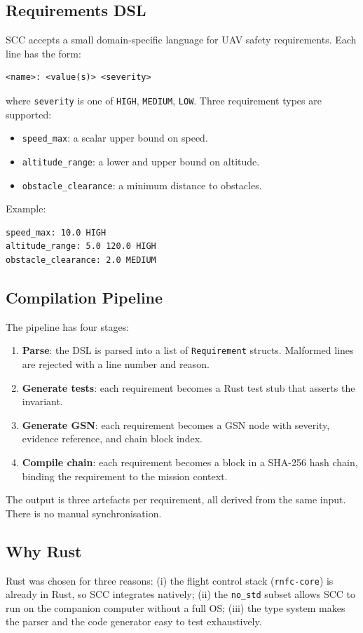 \subsection{Requirements DSL}
SCC accepts a small domain-specific language for UAV safety
requirements. Each line has the form:
\begin{verbatim}
<name>: <value(s)> <severity>
\end{verbatim}
where \texttt{severity} is one of \texttt{HIGH}, \texttt{MEDIUM},
\texttt{LOW}. Three requirement types are supported:
\begin{itemize}
    \item \texttt{speed\_max}: a scalar upper bound on speed.
    \item \texttt{altitude\_range}: a lower and upper bound on altitude.
    \item \texttt{obstacle\_clearance}: a minimum distance to obstacles.
\end{itemize}
Example:
\begin{verbatim}
speed_max: 10.0 HIGH
altitude_range: 5.0 120.0 HIGH
obstacle_clearance: 2.0 MEDIUM
\end{verbatim}

\subsection{Compilation Pipeline}
The pipeline has four stages:
\begin{enumerate}
    \item \textbf{Parse}: the DSL is parsed into a list of
          \texttt{Requirement} structs. Malformed lines are rejected
          with a line number and reason.
    \item \textbf{Generate tests}: each requirement becomes a Rust
          test stub that asserts the invariant.
    \item \textbf{Generate GSN}: each requirement becomes a GSN node
          with severity, evidence reference, and chain block index.
    \item \textbf{Compile chain}: each requirement becomes a block in
          a SHA-256 hash chain, binding the requirement to the
          mission context.
\end{enumerate}
The output is three artefacts per requirement, all derived from the
same input. There is no manual synchronisation.

\subsection{Why Rust}
Rust was chosen for three reasons: (i) the flight control stack
(\texttt{rnfc-core}) is already in Rust, so SCC integrates
natively; (ii) the \texttt{no\_std} subset allows SCC to run on the
companion computer without a full OS; (iii) the type system makes
the parser and the code generator easy to test exhaustively.

